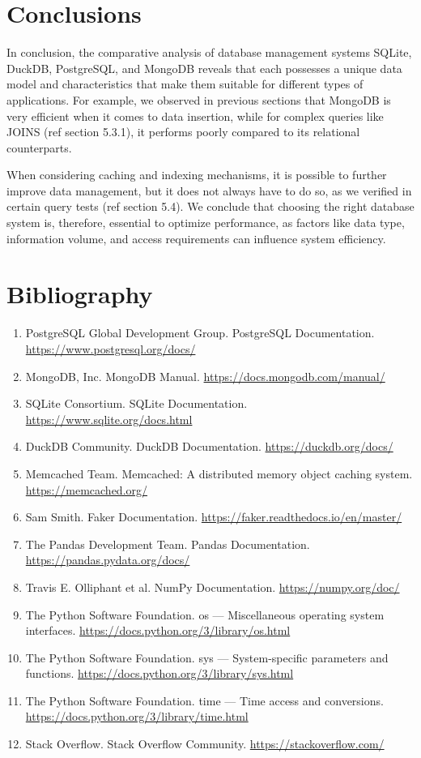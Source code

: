 \documentclass[11pt,a4paper]{article}
\begin{document}
\section{Conclusions}
In conclusion, the comparative analysis of database management systems SQLite, DuckDB, PostgreSQL, and MongoDB reveals that each possesses a unique data model and characteristics that make them suitable for different types of applications. For example, we observed in previous sections that MongoDB is very efficient when it comes to data insertion, while for complex queries like JOINS (ref section 5.3.1), it performs poorly compared to its relational counterparts.

When considering caching and indexing mechanisms, it is possible to further improve data management, but it does not always have to do so, as we verified in certain query tests (ref section 5.4). We conclude that choosing the right database system is, therefore, essential to optimize performance, as factors like data type, information volume, and access requirements can influence system efficiency.

\section{Bibliography}
\begin{enumerate}
\item PostgreSQL Global Development Group. PostgreSQL Documentation. \url{https://www.postgresql.org/docs/}
\item MongoDB, Inc. MongoDB Manual. \url{https://docs.mongodb.com/manual/}
\item SQLite Consortium. SQLite Documentation. \url{https://www.sqlite.org/docs.html}
\item DuckDB Community. DuckDB Documentation. \url{https://duckdb.org/docs/}
\item Memcached Team. Memcached: A distributed memory object caching system. \url{https://memcached.org/}
\item Sam Smith. Faker Documentation. \url{https://faker.readthedocs.io/en/master/}
\item The Pandas Development Team. Pandas Documentation. \url{https://pandas.pydata.org/docs/}
\item Travis E. Olliphant et al. NumPy Documentation. \url{https://numpy.org/doc/}
\item The Python Software Foundation. os — Miscellaneous operating system interfaces. \url{https://docs.python.org/3/library/os.html}
\item The Python Software Foundation. sys — System-specific parameters and functions. \url{https://docs.python.org/3/library/sys.html}
\item The Python Software Foundation. time — Time access and conversions. \url{https://docs.python.org/3/library/time.html}
\item Stack Overflow. Stack Overflow Community. \url{https://stackoverflow.com/}
\end{enumerate}
\end{document}
